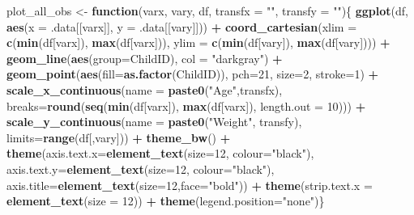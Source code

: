 \documentclass[
  12pt,
]{article}
\newenvironment{Shaded}{\begin{snugshade}}{\end{snugshade}}
\newcommand{\AttributeTok}[1]{\textcolor[rgb]{0.13,0.29,0.53}{#1}}
\newcommand{\ControlFlowTok}[1]{\textcolor[rgb]{0.13,0.29,0.53}{\textbf{#1}}}
\newcommand{\DecValTok}[1]{\textcolor[rgb]{0.00,0.00,0.81}{#1}}
\newcommand{\FunctionTok}[1]{\textcolor[rgb]{0.13,0.29,0.53}{\textbf{#1}}}
\newcommand{\NormalTok}[1]{#1}
\newcommand{\OtherTok}[1]{\textcolor[rgb]{0.56,0.35,0.01}{#1}}
\newcommand{\SpecialCharTok}[1]{\textcolor[rgb]{0.81,0.36,0.00}{\textbf{#1}}}
\newcommand{\StringTok}[1]{\textcolor[rgb]{0.31,0.60,0.02}{#1}}
\begin{document}
\begin{Shaded}
\begin{Highlighting}[]
\NormalTok{plot\_all\_obs }\OtherTok{\textless{}{-}} \ControlFlowTok{function}\NormalTok{(varx, vary, df,}
                             \AttributeTok{transfx =} \StringTok{""}\NormalTok{, }\AttributeTok{transfy =} \StringTok{""}\NormalTok{)\{}
    \FunctionTok{ggplot}\NormalTok{(df, }\FunctionTok{aes}\NormalTok{(}\AttributeTok{x =}\NormalTok{ .data[[varx]], }\AttributeTok{y =}\NormalTok{ .data[[vary]])) }\SpecialCharTok{+} 
    \FunctionTok{coord\_cartesian}\NormalTok{(}\AttributeTok{xlim =} \FunctionTok{c}\NormalTok{(}\FunctionTok{min}\NormalTok{(df[varx]), }\FunctionTok{max}\NormalTok{(df[varx])),}
                    \AttributeTok{ylim =} \FunctionTok{c}\NormalTok{(}\FunctionTok{min}\NormalTok{(df[vary]), }\FunctionTok{max}\NormalTok{(df[vary]))) }\SpecialCharTok{+}
    \FunctionTok{geom\_line}\NormalTok{(}\FunctionTok{aes}\NormalTok{(}\AttributeTok{group=}\NormalTok{ChildID), }\AttributeTok{col =} \StringTok{"darkgray"}\NormalTok{) }\SpecialCharTok{+} 
    \FunctionTok{geom\_point}\NormalTok{(}\FunctionTok{aes}\NormalTok{(}\AttributeTok{fill=}\FunctionTok{as.factor}\NormalTok{(ChildID)), }\AttributeTok{pch=}\DecValTok{21}\NormalTok{, }\AttributeTok{size=}\DecValTok{2}\NormalTok{, }\AttributeTok{stroke=}\DecValTok{1}\NormalTok{) }\SpecialCharTok{+} 
    \FunctionTok{scale\_x\_continuous}\NormalTok{(}\AttributeTok{name =} \FunctionTok{paste0}\NormalTok{(}\StringTok{"Age"}\NormalTok{,transfx), }
                       \AttributeTok{breaks=}\FunctionTok{round}\NormalTok{(}\FunctionTok{seq}\NormalTok{(}\FunctionTok{min}\NormalTok{(df[varx]), }\FunctionTok{max}\NormalTok{(df[varx]), }\AttributeTok{length.out =} \DecValTok{10}\NormalTok{)))  }\SpecialCharTok{+} 
    \FunctionTok{scale\_y\_continuous}\NormalTok{(}\AttributeTok{name =} \FunctionTok{paste0}\NormalTok{(}\StringTok{"Weight"}\NormalTok{, transfy),}
                       \AttributeTok{limits=}\FunctionTok{range}\NormalTok{(df[,vary])) }\SpecialCharTok{+} 
    \FunctionTok{theme\_bw}\NormalTok{() }\SpecialCharTok{+} \FunctionTok{theme}\NormalTok{(}\AttributeTok{axis.text.x=}\FunctionTok{element\_text}\NormalTok{(}\AttributeTok{size=}\DecValTok{12}\NormalTok{, }\AttributeTok{colour=}\StringTok{"black"}\NormalTok{),}
                       \AttributeTok{axis.text.y=}\FunctionTok{element\_text}\NormalTok{(}\AttributeTok{size=}\DecValTok{12}\NormalTok{, }\AttributeTok{colour=}\StringTok{"black"}\NormalTok{), }
                       \AttributeTok{axis.title=}\FunctionTok{element\_text}\NormalTok{(}\AttributeTok{size=}\DecValTok{12}\NormalTok{,}\AttributeTok{face=}\StringTok{"bold"}\NormalTok{)) }\SpecialCharTok{+}
    \FunctionTok{theme}\NormalTok{(}\AttributeTok{strip.text.x =} \FunctionTok{element\_text}\NormalTok{(}\AttributeTok{size =} \DecValTok{12}\NormalTok{)) }\SpecialCharTok{+} \FunctionTok{theme}\NormalTok{(}\AttributeTok{legend.position=}\StringTok{"none"}\NormalTok{)\}}


\end{Highlighting}
\end{Shaded}
\end{document}
